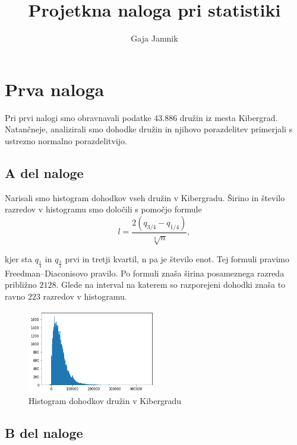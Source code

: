 \documentclass{article}
\title{Projetkna naloga pri statistiki}
\author{Gaja Jamnik}
\date{}
\begin{document}
    \maketitle


\section{Prva naloga}

Pri prvi nalogi smo obravnavali podatke 43.886 družin iz mesta Kibergrad. Natančneje, analizirali smo dohodke
družin in njihovo porazdelitev primerjali s ustrezno normalno porazdelitvijo.

\subsection{A del naloge}

Narisali smo histogram dohodkov vseh družin v Kibergradu. 
Širino in število razredov v histogramu smo določili s pomočjo formule
\begin{equation}
    l = \frac{2(q_{3/4} - q_{1/4})}{\sqrt[3]{n}},
\end{equation}

kjer sta $q_{\frac{1}{4}}$ in $q_{\frac{3}{4}}$ prvi in tretji kvartil, n pa je število enot.
Tej formuli pravimo Freedman–Diaconisovo pravilo. Po formuli znaša širina posameznega razreda približno $2128$.
Glede na interval na katerem so razporejeni dohodki znaša to ravno $223$ razredov v histogramu.

\begin{figure}[H]
    \begin{center}
        \includegraphics*[width=0.5\textwidth]{figure1A.png}
        \caption{Histogram dohodkov družin v Kibergradu}
        \label{hist_dohodki}
    \end{center}
\end{figure}

\subsection{B del naloge}
\end{document}
